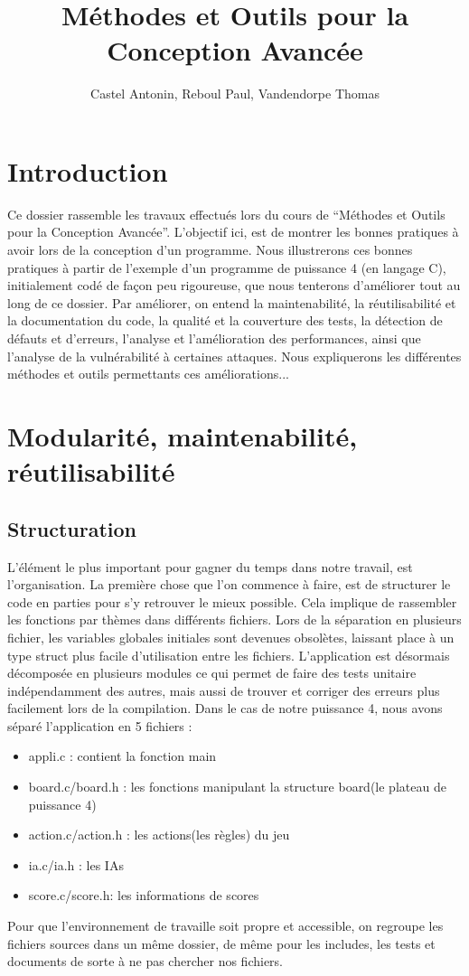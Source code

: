 \documentclass{report}
\title{Méthodes et Outils pour la Conception Avancée}
\author{Castel Antonin, Reboul Paul, Vandendorpe Thomas}
\begin{document}
\maketitle{}
\tableofcontents

\chapter{Introduction}

Ce dossier rassemble les travaux effectués lors du cours de ``Méthodes et Outils pour la Conception Avancée''. L'objectif ici, est de montrer les bonnes pratiques à avoir lors de la conception d'un programme. Nous illustrerons ces bonnes pratiques à partir de l'exemple d'un programme de puissance 4 (en langage C), initialement codé de façon peu rigoureuse, que nous tenterons d'améliorer tout au long de ce dossier. Par améliorer, on entend  la maintenabilité, la réutilisabilité et la documentation du code, la qualité et la couverture des tests, la détection de défauts et d'erreurs, l'analyse et l'amélioration des performances, ainsi que l'analyse de la vulnérabilité à certaines attaques. Nous expliquerons les différentes méthodes et outils permettants ces améliorations...

\chapter{Modularité, maintenabilité, réutilisabilité}
\section{Structuration}
L'élément le plus important pour gagner du temps dans notre travail, est l'organisation. La première chose que l'on commence à faire, est de structurer le code en parties pour s'y retrouver le mieux possible. Cela implique de rassembler les fonctions par thèmes dans différents fichiers. Lors de la séparation en plusieurs fichier, les variables globales initiales sont devenues obsolètes, laissant place à un type struct plus facile d'utilisation entre les fichiers. L'application est désormais décomposée en plusieurs modules ce qui permet de faire des tests unitaire indépendamment des autres, mais aussi de trouver et corriger des erreurs plus facilement lors de la compilation. Dans le cas de notre puissance 4, nous avons séparé l'application en 5 fichiers :
\begin{itemize}
\item appli.c : contient la fonction main
\item board.c/board.h : les fonctions manipulant la structure board(le plateau de puissance 4)
\item action.c/action.h : les actions(les règles) du jeu
\item ia.c/ia.h : les IAs
\item score.c/score.h: les informations de scores
\end{itemize} 
Pour que l'environnement de travaille soit propre et accessible, on regroupe les fichiers sources dans un même dossier, de même pour les includes, les tests et documents de sorte à ne pas chercher nos fichiers.
\end{document}

